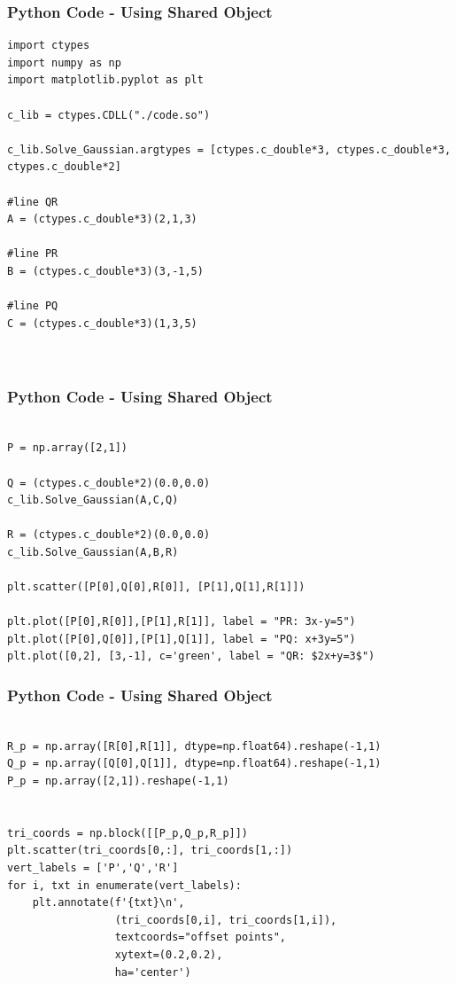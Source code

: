 \documentclass{beamer}
\begin{document}
\begin{frame}[fragile]
    \frametitle{Python Code - Using Shared Object}
    \begin{lstlisting}
import ctypes
import numpy as np
import matplotlib.pyplot as plt

c_lib = ctypes.CDLL("./code.so")

c_lib.Solve_Gaussian.argtypes = [ctypes.c_double*3, ctypes.c_double*3, ctypes.c_double*2]

#line QR
A = (ctypes.c_double*3)(2,1,3)

#line PR
B = (ctypes.c_double*3)(3,-1,5)

#line PQ
C = (ctypes.c_double*3)(1,3,5)



\end{lstlisting}
\end{frame}

\begin{frame}[fragile]
    \frametitle{Python Code - Using Shared Object}
    \begin{lstlisting}

P = np.array([2,1])

Q = (ctypes.c_double*2)(0.0,0.0)
c_lib.Solve_Gaussian(A,C,Q)

R = (ctypes.c_double*2)(0.0,0.0)
c_lib.Solve_Gaussian(A,B,R)

plt.scatter([P[0],Q[0],R[0]], [P[1],Q[1],R[1]])

plt.plot([P[0],R[0]],[P[1],R[1]], label = "PR: 3x-y=5")
plt.plot([P[0],Q[0]],[P[1],Q[1]], label = "PQ: x+3y=5")
plt.plot([0,2], [3,-1], c='green', label = "QR: $2x+y=3$")

\end{lstlisting}
\end{frame}

\begin{frame}[fragile]
    \frametitle{Python Code - Using Shared Object}
    \begin{lstlisting}
    
R_p = np.array([R[0],R[1]], dtype=np.float64).reshape(-1,1)
Q_p = np.array([Q[0],Q[1]], dtype=np.float64).reshape(-1,1)
P_p = np.array([2,1]).reshape(-1,1)


tri_coords = np.block([[P_p,Q_p,R_p]])
plt.scatter(tri_coords[0,:], tri_coords[1,:])
vert_labels = ['P','Q','R']
for i, txt in enumerate(vert_labels):
    plt.annotate(f'{txt}\n',
                 (tri_coords[0,i], tri_coords[1,i]), 
                 textcoords="offset points", 
                 xytext=(0.2,0.2), 
                 ha='center') 

\end{lstlisting}
\end{frame}
\end{document}
